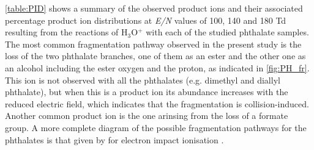  \autoref{table:PID} shows a summary of the observed product ions and their associated percentage product ion distributions at \textit{E/N} values of 100, 140 and 180 Td resulting from the reactions of H$_3$O$^+$ with each of the studied phthalate samples. 
%
The most common fragmentation pathway observed in the present study is the loss of the two phthalate branches, one of them as an ester and the other one as an alcohol including the ester oxygen and the proton, as indicated in \autoref{fig:PH_fr}.
%
This ion is not observed with all the phthalates (e.g. dimethyl and diallyl phthalate), but when this is a product ion its abundance increases with the reduced electric field, which indicates that the fragmentation is collision-induced.
%
Another common product ion is the one arinsing from the loss of a formate group.
%
A more complete diagram of the possible fragmentation pathways for the phthalates is that given by \citeauthor{yin2014mass} for electron impact ionisation \cite{yin2014mass}.

